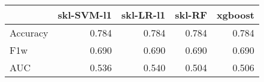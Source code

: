 \begin{tabular}{lrrrr}
\toprule
{} &  skl-SVM-l1 &  skl-LR-l1 &  skl-RF &  xgboost \\
\midrule
Accuracy &       0.784 &      0.784 &   0.784 &    0.784 \\
F1w      &       0.690 &      0.690 &   0.690 &    0.690 \\
AUC      &       0.536 &      0.540 &   0.504 &    0.506 \\
\bottomrule
\end{tabular}
